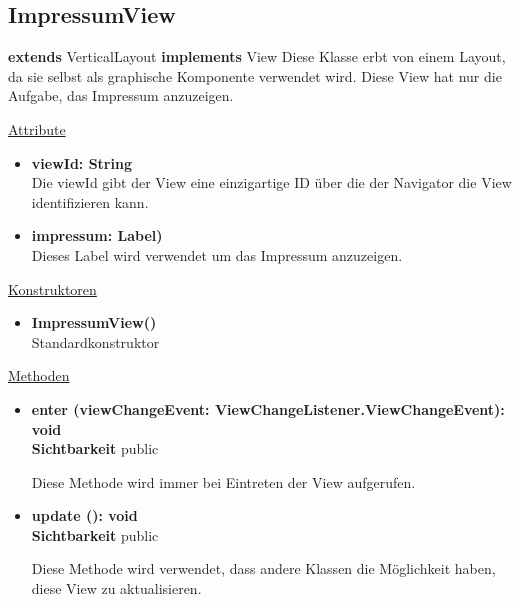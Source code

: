 \newpage
\subsection{ImpressumView}\label{ImpressumView}
\textbf{extends}  VerticalLayout \newline
\textbf{implements} View \newline
Diese Klasse erbt von einem Layout, da sie selbst als graphische Komponente verwendet wird. Diese View hat nur die Aufgabe, das Impressum anzuzeigen.
\newline

\underline{Attribute}
\begin{itemize}
\itemsep0pt
\item \textbf{viewId: String} \hfill\\ 
Die viewId gibt der View eine einzigartige ID über die der Navigator die View identifizieren kann.

\item \textbf{impressum: Label)} \hfill\\ 
Dieses Label wird verwendet um das Impressum anzuzeigen.

\end{itemize}

\underline{Konstruktoren}
\begin{itemize}
\itemsep0pt
\item \textbf{ImpressumView()} \hfill\\
Standardkonstruktor
\end{itemize}

\underline{Methoden}
\begin{itemize}
\itemsep0pt
\item \textbf{enter (viewChangeEvent: ViewChangeListener.ViewChangeEvent): void}\hfill\\
\textbf{Sichtbarkeit} public

Diese Methode wird immer bei Eintreten der View aufgerufen.

\item \textbf{update (): void}\hfill\\
\textbf{Sichtbarkeit} public

Diese Methode wird verwendet, dass andere Klassen die Möglichkeit haben, diese View zu aktualisieren.

\end{itemize}
